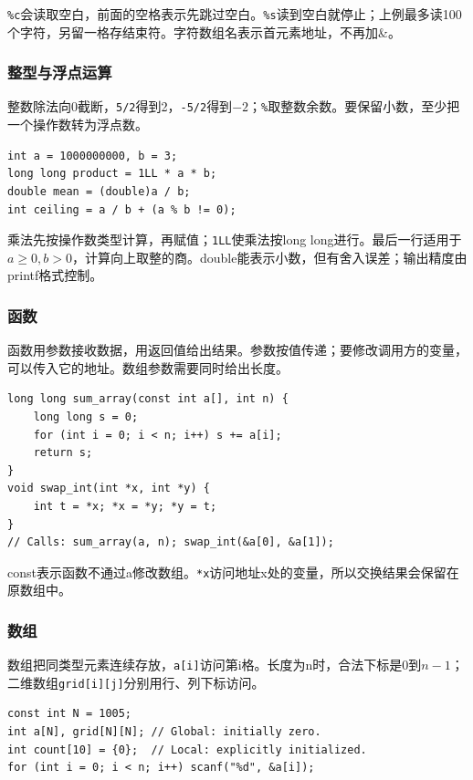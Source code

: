 \documentclass[UTF8,11pt,a4paper,fontset=none]{ctexart}
\begin{document}
\texttt{\%c}会读取空白，前面的空格表示先跳过空白。\texttt{\%s}读到空白就停止；上例最多读100个字符，另留一格存结束符。字符数组名表示首元素地址，不再加\&。
\subsubsection{整型与浮点运算}
整数除法向0截断，\texttt{5/2}得到2，\texttt{-5/2}得到$-2$；\texttt{\%}取整数余数。要保留小数，至少把一个操作数转为浮点数。
\par\noindent\begin{minipage}{\linewidth}
\begin{lstlisting}
int a = 1000000000, b = 3;
long long product = 1LL * a * b;
double mean = (double)a / b;
int ceiling = a / b + (a % b != 0);
\end{lstlisting}
\end{minipage}\par
乘法先按操作数类型计算，再赋值；\texttt{1LL}使乘法按long long进行。最后一行适用于$a\ge0,b>0$，计算向上取整的商。double能表示小数，但有舍入误差；输出精度由printf格式控制。
\subsubsection{函数}
函数用参数接收数据，用返回值给出结果。参数按值传递；要修改调用方的变量，可以传入它的地址。数组参数需要同时给出长度。
\par\noindent\begin{minipage}{\linewidth}
\begin{lstlisting}
long long sum_array(const int a[], int n) {
    long long s = 0;
    for (int i = 0; i < n; i++) s += a[i];
    return s;
}
void swap_int(int *x, int *y) {
    int t = *x; *x = *y; *y = t;
}
// Calls: sum_array(a, n); swap_int(&a[0], &a[1]);
\end{lstlisting}
\end{minipage}\par
const表示函数不通过a修改数组。\texttt{*x}访问地址x处的变量，所以交换结果会保留在原数组中。
\subsubsection{数组}
数组把同类型元素连续存放，\texttt{a[i]}访问第i格。长度为n时，合法下标是0到$n-1$；二维数组\texttt{grid[i][j]}分别用行、列下标访问。
\par\noindent\begin{minipage}{\linewidth}
\begin{lstlisting}
const int N = 1005;
int a[N], grid[N][N]; // Global: initially zero.
int count[10] = {0};  // Local: explicitly initialized.
for (int i = 0; i < n; i++) scanf("%d", &a[i]);
\end{lstlisting}
\end{minipage}\par
\end{document}
